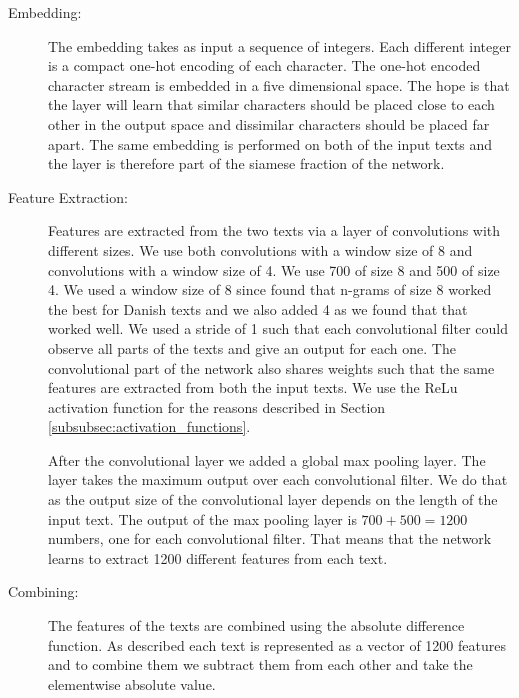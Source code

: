\begin{description}

    \item[Embedding:]

        The embedding takes as input a sequence of integers. Each different
        integer is a compact one-hot encoding of each character. The one-hot
        encoded character stream is embedded in a five dimensional space. The
        hope is that the layer will learn that similar characters should be
        placed close to each other in the output space and dissimilar characters
        should be placed far apart. The same embedding is performed on both of
        the input texts and the layer is therefore part of the siamese fraction
        of the network.

    \item[Feature Extraction:]

        Features are extracted from the two texts via a layer of convolutions
        with different sizes. We use both convolutions with a window size of 8
        and convolutions with a window size of 4. We use 700 of size 8 and 500
        of size 4. We used a window size of 8 since \citet{aalykke2016} found
        that n-grams of size 8 worked the best for Danish texts and we also
        added 4 as we found that that worked well. We used a stride of 1 such
        that each convolutional filter could observe all parts of the texts and
        give an output for each one. The convolutional part of the network also
        shares weights such that the same features are extracted from both the
        input texts. We use the \gls{ReLu} activation function for the reasons
        described in Section \ref{subsubsec:activation_functions}.

        After the convolutional layer we added a global max pooling layer. The
        layer takes the maximum output over each convolutional filter. We do
        that as the output size of the convolutional layer depends on the length
        of the input text. The output of the max pooling layer is $700 + 500 =
        1200$ numbers, one for each convolutional filter. That means that the
        network learns to extract 1200 different features from each text.

    \item[Combining:]

        The features of the texts are combined using the absolute difference
        function. As described each text is represented as a vector of 1200
        features and to combine them we subtract them from each other and take
        the elementwise absolute value.


\end{description}
